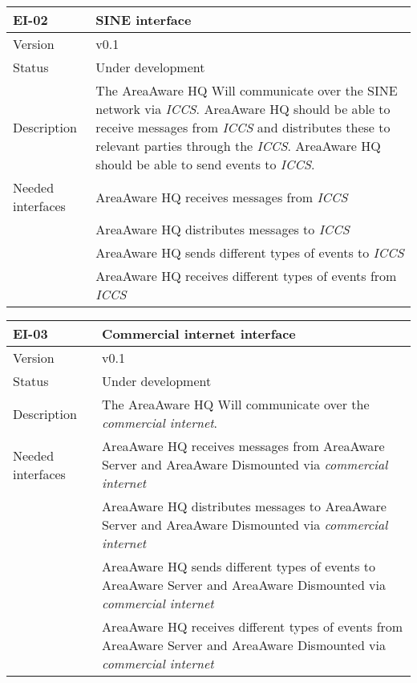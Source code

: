 \begin{longtable}{| p{3.5cm} |  p{10cm} | }
	\hline
	\textbf{EI-02} &  \textbf{SINE interface} \\
	\hline
	Version & v0.1 \\
	\hline
	Status & Under development \\
	\hline
	Description & The AreaAware HQ Will communicate over the SINE network via \emph{ICCS}\citep{iccs}. AreaAware HQ should be able to receive messages from \emph{ICCS} and distributes these to relevant parties through the \emph{ICCS}. AreaAware HQ should be able to send events to \emph{ICCS}.
	\\
	\hline
	Needed interfaces 
	& AreaAware HQ receives messages from \emph{ICCS} \\
	& AreaAware HQ distributes messages to \emph{ICCS} \\
	& AreaAware HQ sends different types of events to \emph{ICCS} \\
	& AreaAware HQ receives different types of events from \emph{ICCS} \\
	\hline
\end{longtable}

\begin{longtable}{| p{3.5cm} |  p{10cm} | }
	\hline
	\textbf{EI-03} &  \textbf{Commercial internet interface} \\
	\hline
	Version & v0.1 \\
	\hline
	Status & Under development \\
	\hline
	Description & The AreaAware HQ Will communicate over the \emph{commercial internet}.
	\\
	\hline
	Needed interfaces 
	& AreaAware HQ receives messages from AreaAware Server and AreaAware Dismounted via \emph{commercial internet} \\
	& AreaAware HQ distributes messages to AreaAware Server and AreaAware Dismounted via \emph{commercial internet} \\ 
	& AreaAware HQ sends different types of events to AreaAware Server and AreaAware Dismounted via \emph{commercial internet} \\
	& AreaAware HQ receives different types of events from AreaAware Server and AreaAware Dismounted via \emph{commercial internet} \\
	\hline
\end{longtable}

